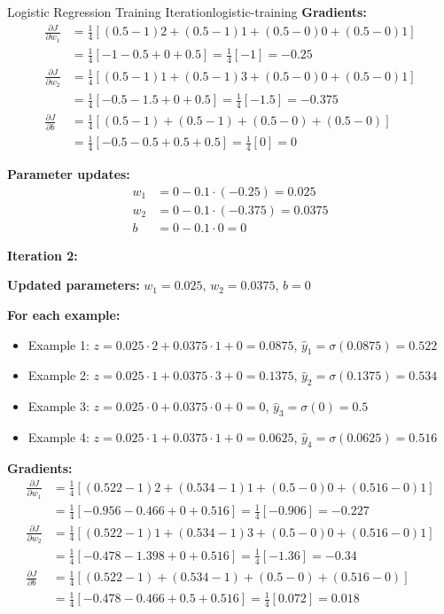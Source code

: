 \documentclass[12pt]{article}
\begin{document}
\begin{example}{Logistic Regression Training Iteration}{logistic-training}
\textbf{Gradients:}
\begin{align}
\frac{\partial J}{\partial w_1} &= \frac{1}{4}[(0.5-1)2 + (0.5-1)1 + (0.5-0)0 + (0.5-0)1] \\
&= \frac{1}{4}[-1 - 0.5 + 0 + 0.5] = \frac{1}{4}[-1] = -0.25 \\
\frac{\partial J}{\partial w_2} &= \frac{1}{4}[(0.5-1)1 + (0.5-1)3 + (0.5-0)0 + (0.5-0)1] \\
&= \frac{1}{4}[-0.5 - 1.5 + 0 + 0.5] = \frac{1}{4}[-1.5] = -0.375 \\
\frac{\partial J}{\partial b} &= \frac{1}{4}[(0.5-1) + (0.5-1) + (0.5-0) + (0.5-0)] \\
&= \frac{1}{4}[-0.5 - 0.5 + 0.5 + 0.5] = \frac{1}{4}[0] = 0
\end{align}

\textbf{Parameter updates:}
\begin{align}
w_1 &= 0 - 0.1 \cdot (-0.25) = 0.025 \\
w_2 &= 0 - 0.1 \cdot (-0.375) = 0.0375 \\
b &= 0 - 0.1 \cdot 0 = 0
\end{align}

\textbf{Iteration 2:}

\textbf{Updated parameters:} $w_1 = 0.025$, $w_2 = 0.0375$, $b = 0$

\textbf{For each example:}
\begin{itemize}
    \item Example 1: $z = 0.025 \cdot 2 + 0.0375 \cdot 1 + 0 = 0.0875$, $\hat{y}_1 = \sigma(0.0875) = 0.522$
    \item Example 2: $z = 0.025 \cdot 1 + 0.0375 \cdot 3 + 0 = 0.1375$, $\hat{y}_2 = \sigma(0.1375) = 0.534$
    \item Example 3: $z = 0.025 \cdot 0 + 0.0375 \cdot 0 + 0 = 0$, $\hat{y}_3 = \sigma(0) = 0.5$
    \item Example 4: $z = 0.025 \cdot 1 + 0.0375 \cdot 1 + 0 = 0.0625$, $\hat{y}_4 = \sigma(0.0625) = 0.516$
\end{itemize}

\textbf{Gradients:}
\begin{align}
\frac{\partial J}{\partial w_1} &= \frac{1}{4}[(0.522-1)2 + (0.534-1)1 + (0.5-0)0 + (0.516-0)1] \\
&= \frac{1}{4}[-0.956 - 0.466 + 0 + 0.516] = \frac{1}{4}[-0.906] = -0.227 \\
\frac{\partial J}{\partial w_2} &= \frac{1}{4}[(0.522-1)1 + (0.534-1)3 + (0.5-0)0 + (0.516-0)1] \\
&= \frac{1}{4}[-0.478 - 1.398 + 0 + 0.516] = \frac{1}{4}[-1.36] = -0.34 \\
\frac{\partial J}{\partial b} &= \frac{1}{4}[(0.522-1) + (0.534-1) + (0.5-0) + (0.516-0)] \\
&= \frac{1}{4}[-0.478 - 0.466 + 0.5 + 0.516] = \frac{1}{4}[0.072] = 0.018
\end{align}


\end{example}
\end{document}
